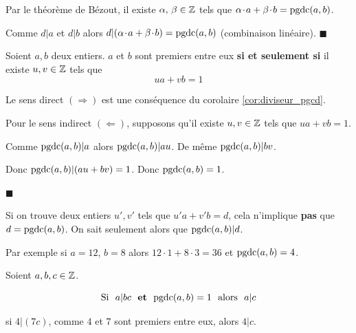 \smallskip
\begin{demonstration}
Par le théorème de Bézout, il existe $\alpha,\,\beta\in\mathbb{Z}$ tels que $\alpha\hspace*{-0.5mm}\cdot\hspace*{-0.5mm} a + \beta\hspace*{-0.5mm}\cdot\hspace*{-0.5mm} b=\textrm{pgdc}(a,b)$.

\medskip
Comme $d|a$ et $d|b$ alors $d | (\alpha\hspace*{-0.5mm}\cdot\hspace*{-0.5mm} a+\beta\hspace*{-0.5mm}\cdot\hspace*{-0.5mm} b)=\textrm{pgdc}(a,b)$ (combinaison linéaire).
\vspace{-3mm}\hfill $\blacksquare$
\end{demonstration}

\bigskip
\begin{corolaire}
	\label{cor-Bezout}
Soient $a, b$ deux entiers. $a$ et $b$ sont premiers entre eux
\textbf{si et seulement si} il existe $u,v \in \mathbb{Z}$ tels que
$$ua+vb=1$$
\end{corolaire}

\begin{demonstration}
Le sens direct $(\Rightarrow)$ est une conséquence du corolaire \ref*{cor:diviseur_pgcd}.

\medskip
Pour le sens indirect $(\Leftarrow)$, supposons qu'il existe $u,v\in\mathbb{Z}$ tels que $ua+vb=1$.

\smallskip
Comme $\textrm{pgdc}(a,b)|a$ alors $\textrm{pgdc}(a,b)|au$. De même $\textrm{pgdc}(a,b)|bv$.

\smallskip
Donc $\textrm{pgdc}(a,b)|(au+bv)=1$. Donc $\textrm{pgdc}(a,b)=1$.

\vspace{-3mm}\hfill $\blacksquare$
\end{demonstration}

\medskip
\begin{remarque}
Si on trouve deux entiers $u',v'$ tels que $u'a+v'b=d$, cela n'implique
\textbf{pas} que $d=\textrm{pgdc}(a,b)$. On sait seulement alors que $\textrm{pgdc}(a,b)|d$.

\smallskip
Par exemple si $a=12$, $b=8$ alors $12 \cdot 1 + 8 \cdot 3 = 36$ et $\textrm{pgdc}(a,b)=4$.
\end{remarque}

\bigskip
\begin{corolaire}
Soient $a,b,c \in \mathbb{Z}$.

$$\textrm{Si} \ \ a | bc \ \  \textrm{\bf et} \ \  \textrm{pgdc}(a,b)=1 \ \  \textrm{alors} \ \  a|c$$
\end{corolaire}

\medskip
\begin{exemple} si $4 | (7c)$, comme $4$ et $7$ sont premiers entre eux, alors $4|c$.
\end{exemple}

